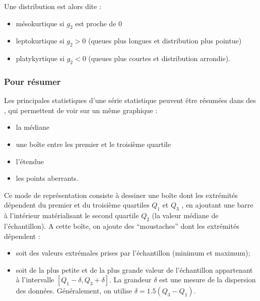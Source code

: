 \documentclass[letterpaper,10pt,english]{jupyterBook}
\begin{document}
\sphinxAtStartPar
Une distribution est alors dite :
\begin{itemize}
\item {} 
\sphinxAtStartPar
mésokurtique si \(g_2\) est proche de 0

\item {} 
\sphinxAtStartPar
leptokurtique si \(g_2>0\) (queues plus longues et distribution plus pointue)

\item {} 
\sphinxAtStartPar
platykyrtique si \(g_2<0\) (queues plus courtes et distribution arrondie).

\end{itemize}


\subsubsection{Pour résumer}
\label{\detokenize{statsdescriptives:pour-resumer}}\label{\detokenize{statsdescriptives:boxplot}}
\sphinxAtStartPar
Les principales statistiques d’une série statistique peuvent être résumées dans des , qui permettent de voir sur un même graphique :
\begin{itemize}
\item {} 
\sphinxAtStartPar
la médiane

\item {} 
\sphinxAtStartPar
une boîte entre les premier et le troisième quartile

\item {} 
\sphinxAtStartPar
l’étendue

\item {} 
\sphinxAtStartPar
les points aberrants.

\end{itemize}

\sphinxAtStartPar
Ce mode de représentation consiste à dessiner une boîte dont les extrémités dépendent du premier et du troisième quartiles \(Q_1\) et \(Q_3\) , en ajoutant une barre à l’intérieur
matérialisant le second quartile  \(Q_2\) (la valeur médiane de l’échantillon). A cette boîte, on ajoute des “moustaches” dont les extrémités dépendent :
\begin{itemize}
\item {} 
\sphinxAtStartPar
soit des valeurs extrémales prises par l’échantillon (minimum et maximum);

\item {} 
\sphinxAtStartPar
soit de la plus petite et de la plus grande valeur de l’échantillon appartenant à l’intervalle \([Q_1 -\delta, Q_3+\delta ]\). La grandeur \(\delta\) est une mesure de la dispersion des données. Généralement, on utilise \(\delta = 1.5(Q_3-Q_1)\).

\end{itemize}
\end{document}
